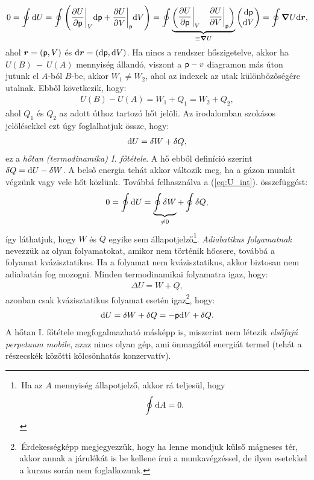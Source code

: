 \begin{align}\label{eq:U_int}
    0 = \oint \mathrm{d}U = \oint\left({\frac{\partial{U}}{\partial{\mathsf p}}\bigg|_V\mathrm{d}\mathsf p + \frac{\partial{U}}{\partial{V}}\bigg|_\mathsf p \mathrm{d}V}\right) = \oint
    \underbrace{\begin{pmatrix}
    \dfrac{\partial U}{\partial \mathsf p}\bigg|_V & \dfrac{\partial U}{\partial V}\bigg|_\mathsf p
    \end{pmatrix}}_{\equiv\bm\nabla U}
    \begin{pmatrix}
    \mathrm{d}\mathsf p \\ \mathrm{d}V
    \end{pmatrix} = \oint \bm\nabla U \mathrm{d}\bm r,
\end{align}
ahol $\bm r=(\mathsf p,V)$ és $\mathrm{d}\bm r = (\mathrm{d}\mathsf p, \mathrm{d}V)$.
Ha nincs a rendszer hőszigetelve, akkor ha $U(B)~{-}~U(A)$ mennyiség állandó, viszont a $\mathsf p-v$ diagramon más úton jutunk el $A$-ból $B$-be, akkor $W_1\neq W_2$, ahol az indexek az utak különbözőségére utalnak. Ebből következik, hogy:
\begin{align}
    U(B)-U(A) = W_1+Q_1 = W_2+Q_2,
\end{align}
ahol $Q_1$ és $Q_2$ az adott úthoz tartozó hőt jelöli. Az irodalomban szokásos jelölésekkel ezt úgy foglalhatjuk össze, hogy:
\begin{align}
    \mathrm{d}U = \delta W + \delta Q,
\end{align}
ez a \emph{hőtan (termodinamika) I. főtétele}. A hő ebből definíció szerint $\delta Q = \mathrm{d}U-\delta W$. A belső energia tehát akkor változik meg, ha a gázon munkát végzünk vagy vele hőt közlünk. Továbbá felhasználva a (\ref{eq:U_int}). összefüggést:
\begin{align}
    0 = \oint \mathrm{d}U = \underbrace{\oint \delta W}_{\neq 0} + \oint \delta Q,
\end{align}
így láthatjuk, hogy $W$ és $Q$ egyike sem állapotjelző\footnote{\,Ha az $A$ mennyiség állapotjelző, akkor rá teljesül, hogy $$\oint \mathrm{d}A=0.$$}.
\emph{Adiabatikus folyamatnak} nevezzük az olyan folyamatokat, amikor nem történik hőcsere, továbbá a folyamat kvázisztatikus. Ha a folyamat nem kvázisztatikus, akkor biztosan nem adiabatán fog mozogni. Minden termodinamikai folyamatra igaz, hogy:
\begin{align}
    \Delta U = W +Q,
\end{align}
azonban csak kvázisztatikus folyamat esetén igaz\footnote{\,Érdekességképp megjegyezzük, hogy ha lenne mondjuk külső mágneses tér, akkor annak a járulékát is be kellene írni a munkavégzéssel, de ilyen esetekkel a kurzus során nem foglalkozunk.}, hogy:
\begin{align}
    \mathrm{d}U = \delta W+ \delta Q = -\mathsf p\mathrm{d}V +\delta Q.
\end{align}
A hőtan I. főtétele megfogalmazható másképp is, miszerint nem létezik \emph{elsőfajú perpetuum mobile}, azaz nincs olyan gép, ami önmagától energiát termel (tehát a részecskék közötti kölcsönhatás konzervatív).


